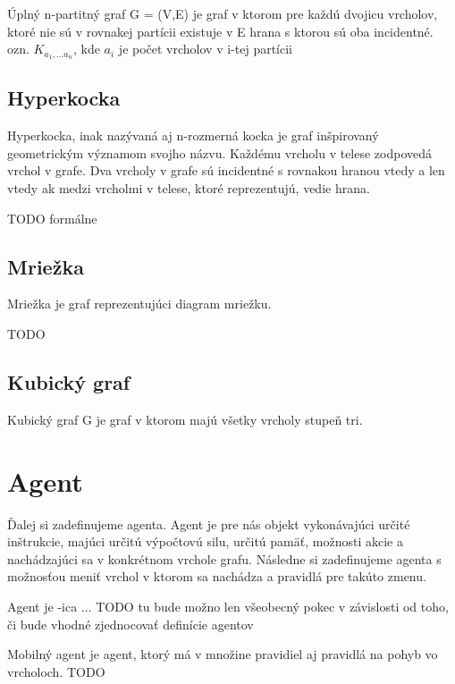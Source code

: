 \begin{defin}
Úplný n-partitný graf G = (V,E) je graf v ktorom pre každú dvojicu vrcholov, ktoré nie sú v rovnakej partícii existuje v E hrana s ktorou sú oba incidentné.\\
ozn. $K_{a_1,...a_n}$, kde $a_i$ je počet vrcholov v i-tej partícii
\end{defin}

\subsection{Hyperkocka}
Hyperkocka, inak nazývaná aj n-rozmerná kocka je graf inšpirovaný geometrickým významom svojho názvu. Každému vrcholu v telese zodpovedá vrchol v grafe. Dva vrcholy v grafe sú incidentné s rovnakou hranou vtedy a len vtedy ak medzi vrcholmi v telese, ktoré reprezentujú, vedie hrana.
\begin{defin}
TODO formálne
\end{defin}
\subsection{Mriežka}
Mriežka je graf reprezentujúci diagram mriežku.
\begin{defin}
TODO
\end{defin}
\subsection{Kubický graf}
\begin{defin}
Kubický graf G je graf v ktorom majú všetky vrcholy stupeň tri.
\end{defin}
\section{Agent}
Ďalej si zadefinujeme agenta. Agent je pre nás objekt vykonávajúci určité inštrukcie, majúci určitú výpočtovú silu, určitú pamäť, možnosti akcie a nachádzajúci sa v konkrétnom vrchole grafu. Následne si zadefinujeme agenta s možnosťou meniť vrchol v ktorom sa nachádza a pravidlá pre takúto zmenu.\\
\begin{defin}
Agent je -ica ... TODO tu bude možno len všeobecný pokec v závislosti od toho, či bude vhodné zjednocovať definície agentov
\end{defin}

\begin{defin}
Mobilný agent je agent, ktorý má v množine pravidiel aj pravidlá na pohyb vo vrcholoch.
TODO
\end{defin}

